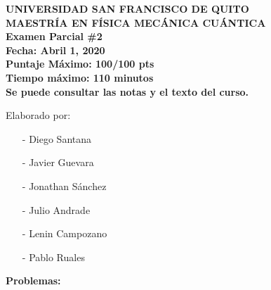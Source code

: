 \documentclass[answers,11pt]{exam}
\renewcommand{\=}[1]{\stackrel{#1}{=}} %
\theoremstyle{definition}
\theoremstyle{remark}
\begin{document}
\begin{center}
{\bf UNIVERSIDAD SAN FRANCISCO DE QUITO\\
MAESTRÍA EN FÍSICA
MECÁNICA CUÁNTICA \\ 
Examen Parcial \#2 \\ 
Fecha: Abril 1, 2020 \\
Puntaje Máximo: 100/100 pts\\
Tiempo máximo: 110 minutos \\ 
Se puede consultar las notas y el texto del curso.\\
}
\end{center}
\vspace{0.1in}


Elaborado por:

\begin{itemize}
 \item[-] Diego Santana
 \item[-] Javier Guevara
 \item[-] Jonathan Sánchez
 \item[-] Julio Andrade
 \item[-] Lenin Campozano
 \item[-] Pablo Ruales
\end{itemize}
\vspace{0.1in}

{\bf Problemas:}\\

\begin{questions}












\end{questions}
\end{document}
